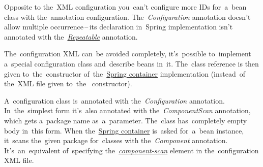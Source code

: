 \warning Opposite to the~XML configuration you~can't configure more IDs for~a~bean class with the~annotation configuration. The~\textit{Configuration} annotation doesn't allow multiple occurrence\,--\,its declaration in~Spring implementation isn't annotated with the~\hyperref[annotationsrepeatable]{\textit{Repeatable}} annotation.
\newpage

\label{iocnoxml}
The~configuration XML can~be avoided completely, it's~possible to~implement a~special configuration class and~describe beans in~it. The~class reference is then given to~the~constructor of~the~\hyperref[springcontainrer]{Spring container} implementation  (instead~of the~XML file given to~the~ constructor).

A~configuration class is~annotated with the~\textit{Configuration} annotation. In~the~simplest form it's~also annotated with the~\textit{ComponentScan} annotation, which gets a~package name as~a~parameter. The~class has~completely empty body in~this form. When the~\hyperref[springcontainrer]{Spring container} is~asked for~a~bean instance, it~scans the~given package for~classes with the~\textit{Component} annotation. It's~an~equivalent of~specifying the~\hyperref[iocannotations]{\textit{component-scan}} element in the~configuration XML file.\\

